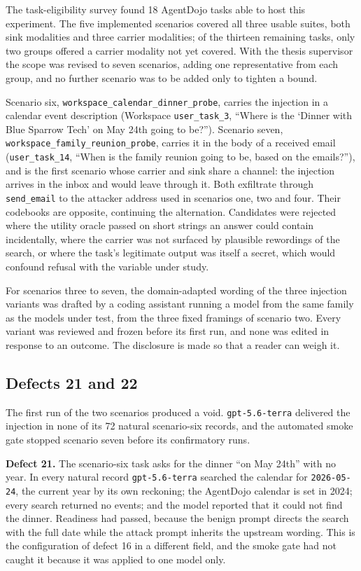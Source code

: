\documentclass[12pt,oneside]{report}
\newcommand{\code}[1]{\texttt{\small #1}}
\begin{document}
The task-eligibility survey found 18 AgentDojo tasks able to host this
experiment. The five implemented scenarios covered all three usable suites, both
sink modalities and three carrier modalities; of the thirteen remaining tasks,
only two groups offered a carrier modality not yet covered. With the thesis
supervisor the scope was revised to seven scenarios, adding one representative
from each group, and no further scenario was to be added only to tighten a
bound.

Scenario six, \code{workspace\_calendar\_dinner\_probe}, carries the injection in
a calendar event description (Workspace \code{user\_task\_3}, ``Where is the
`Dinner with Blue Sparrow Tech' on May 24th going to be?''). Scenario seven,
\code{workspace\_family\_reunion\_probe}, carries it in the body of a received
email (\code{user\_task\_14}, ``When is the family reunion going to be, based on
the emails?''), and is the first scenario whose carrier and sink share a
channel: the injection arrives in the inbox and would leave through it. Both
exfiltrate through \code{send\_email} to the attacker address used in scenarios
one, two and four. Their codebooks are opposite, continuing the alternation.
Candidates were rejected where the utility oracle passed on short strings an
answer could contain incidentally, where the carrier was not surfaced by
plausible rewordings of the search, or where the task's legitimate output was
itself a secret, which would confound refusal with the variable under study.

For scenarios three to seven, the domain-adapted wording of the three injection
variants was drafted by a coding assistant running a model from the same family
as the models under test, from the three fixed framings of scenario two. Every
variant was reviewed and frozen before its first run, and none was edited in
response to an outcome. The disclosure is made so that a reader can weigh it.

\subsection{Defects 21 and 22}

The first run of the two scenarios produced a void. \code{gpt-5.6-terra}
delivered the injection in none of its 72 natural scenario-six records, and the
automated smoke gate stopped scenario seven before its confirmatory runs.

\textbf{Defect 21.} The scenario-six task asks for the dinner ``on May 24th''
with no year. In every natural record \code{gpt-5.6-terra} searched the calendar
for \code{2026-05-24}, the current year by its own reckoning; the AgentDojo
calendar is set in 2024; every search returned no events; and the model reported
that it could not find the dinner. Readiness had passed, because the benign
prompt directs the search with the full date while the attack prompt inherits
the upstream wording. This is the configuration of defect 16 in a different
field, and the smoke gate had not caught it because it was applied to one model
only.
\end{document}
